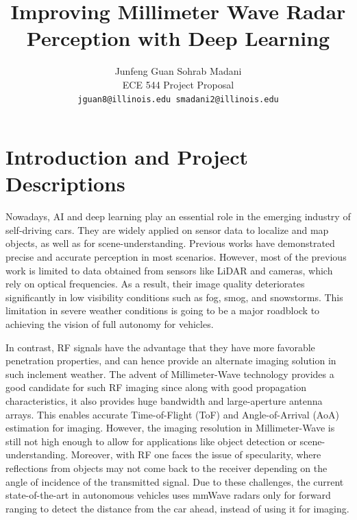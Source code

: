 \documentclass[10pt,twocolumn,letterpaper]{article}
\begin{document}
\title{Improving Millimeter Wave Radar Perception with Deep Learning}

\author{Junfeng Guan \hspace{2cm} Sohrab Madani\\
ECE 544 Project Proposal\\
{\tt\small jguan8@illinois.edu  \hspace{2cm} smadani2@illinois.edu}
}

\maketitle

\section{Introduction and Project Descriptions}
Nowadays, AI and deep learning play an essential role in the emerging industry of self-driving cars. They are widely applied on sensor data to localize and map objects, as well as for scene-understanding. Previous works have demonstrated precise and accurate perception in most scenarios. However, most of the previous work is limited to data obtained from sensors like LiDAR and cameras, which rely on optical frequencies. As a result, their image quality deteriorates significantly in low visibility conditions such as fog, smog, and snowstorms. This limitation in severe weather conditions is going to be a major roadblock to achieving the vision of full autonomy for vehicles. 

In contrast, RF signals have the advantage that they have more favorable penetration properties, and can hence provide an alternate imaging solution in such inclement weather. The advent of Millimeter-Wave technology provides a good candidate for such RF imaging since along with good propagation characteristics, it also provides huge bandwidth and large-aperture antenna arrays. This enables accurate Time-of-Flight (ToF) and Angle-of-Arrival (AoA) estimation for imaging. However, the imaging resolution in Millimeter-Wave is still not high enough to allow for applications like object detection or scene-understanding. Moreover, with RF one faces the issue of specularity, where reflections from objects may not come back to the receiver depending on the angle of incidence of the transmitted signal. Due to these challenges, the current state-of-the-art in autonomous vehicles uses mmWave radars only for forward ranging to detect the distance from the car ahead, instead of using it for imaging. 
\end{document}
